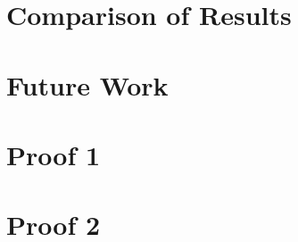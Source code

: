 \documentclass[12pt, twoside, openright]{report}
\begin{document}
\blindtext
\blinditemize
\blindtext
\blindenumerate
\Blindtext
\blinditemize
\Blindtext
\blinddescription
\Blindtext

\chapter{Comparison of Results}

\Blindtext

\chapter{Future Work}

\Blindtext

\appendix

\chapter{Proof 1}

\blindmathtrue
\Blindtext

\chapter{Proof 2}

\blindtext
\end{document}

